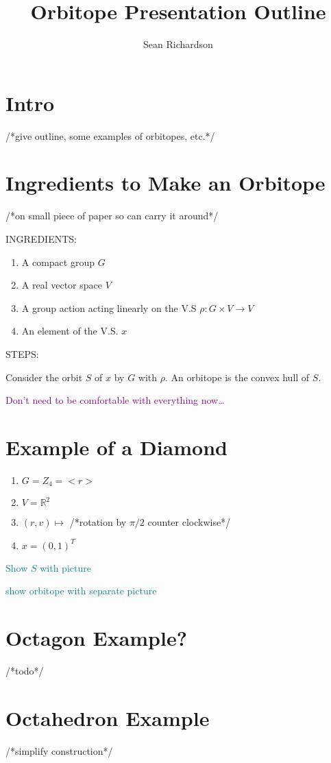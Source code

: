 \documentclass[12]{amsart}
\newcommand{\toadd}[1]{/*#1*/}
\newcommand{\say}[1]{\textcolor{purple}{#1}}
\newcommand{\note}[1]{\textcolor{teal}{#1}}
\begin{document}
\title{Orbitope Presentation Outline}
\author{Sean Richardson}
\maketitle
\section{Intro}%
\toadd{give outline, some examples of orbitopes, etc.}

\section{Ingredients to Make an Orbitope}
\toadd{on small piece of paper so can carry it around}

INGREDIENTS:
\begin{enumerate}[(1)]
	\item A compact group $G$
	\item A real vector space $V$
	\item A group action acting linearly on the V.S $\rho: G \times V \to V$
	\item An element of the V.S.	$x$
\end{enumerate}

STEPS:

Consider the orbit $S$ of $x$ by $G$ with $\rho$. An orbitope is the convex hull of $S$.

\say{Don't need to be comfortable with everything now\dots}
\section{Example of a Diamond}
\begin{enumerate}[(1)]
	\item $G = Z_4 = <r>$
	\item $V = \mathbb{R}^2$
	\item $(r,v) \mapsto$ \toadd{rotation by $\pi/2$ counter clockwise}
	\item $x = (0,1)^T$
\end{enumerate}

\note{Show $S$ with picture}

\note{show orbitope with separate picture}
\section{Octagon Example?}
\toadd{todo}

\section{Octahedron Example}
\toadd{simplify construction}
\end{document}
